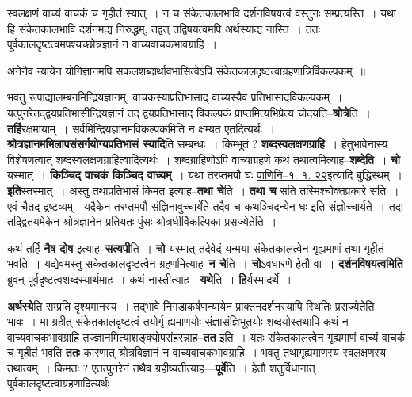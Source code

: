 \documentclass[article,12pt,a4paper]{memoir}
\begin{document}
	  \pstart स्वलक्षणं वाच्यं वाचकं च गृहीतं स्यात् । न च संकेतकालभावि दर्शनविषयत्वं वस्तुनः सम्प्रत्यस्ति । यथा हि संकेतकालभावि दर्शनमद्य निरुद्धम्, तद्वत् तद्विषयत्वमपि अर्थस्याद्य नास्ति । ततः पूर्वकालदृष्टत्वमपश्यच्छोत्रज्ञानं न वाच्यवाचकभावग्राहि ।
	\pend
        

	  \pstart अनेनैव न्यायेन योगिज्ञानमपि सकलशब्दार्थावभासित्वेऽपि संकेतकालदृष्टत्वाग्रहणान्निर्विकल्पकम् ॥
	\pend
      
	  \endgroup
	

	  \pstart भवतु रूपाद्यालम्बनमिन्द्रियज्ञानम्, वाचकस्याप्रतिभासाद् वाच्यस्यैव प्रतिभासादविकल्पकम् । यत्पुनरेतद्द्वयप्रतिभासीन्द्रियज्ञानं तद् द्वयप्रतिभासाद् विकल्पकं प्राप्तमित्यभिप्रेत्य चोदयति--\textbf{श्रोत्रे}ति । \textbf{तर्हि}रक्षमायाम् । सर्वमिन्द्रियज्ञानमविकल्पकमिति न क्षम्यत एतदित्यर्थः । \textbf{श्रोत्रज्ञानमभिलापसंसर्गयोग्यप्रतिभासं स्यादि}ति सम्बन्धः । किम्भूतं ? \textbf{शब्दस्वलक्षणग्राहि} । हेतुभावेनास्य विशेषणत्वात् शब्दस्वलक्षणग्राहित्वादित्यर्थः । शब्दग्राहिणोऽपि वाच्याग्रहणे कथं तथात्वमित्याह--\textbf{शब्देति}\leavevmode{} । \textbf{चो} यस्मात् । \textbf{किञ्चिद् वाचकं किञ्चिद् वाच्यम्} । यथा तरप्तमपौ घः \href{http://sarit.indology.info/?cref=Pā.1.1.22}{पाणिनि--१. १. २२}इत्यादि बुद्धिस्थम् । \textbf{इति}स्तस्मात् । अस्तु तथाप्रतिभासं किमत इत्याह--\textbf{तथा चे}ति । \textbf{तथा च} सति तस्मिश्चोक्तप्रकारे सति । एवं चैतद् द्रष्टव्यम्—यदैकेन तरप्तमपौ संज्ञिनावुच्चार्येते तदैव च कथञ्चिदन्येन घः इति संज्ञोच्चार्यते । तदा तद्द्वितयमेकेन श्रोत्रज्ञानेन प्रतियतः पुंसः श्रोत्रधीर्विकल्पिका प्रसज्येतेति ।
	\pend
      

	  \pstart कथं तर्हि \textbf{नैष दोष} इत्याह--\textbf{सत्यपी}ति । \textbf{चो} यस्मात् तदेवेदं यन्मया संकेतकालत्वेन गृह्यमाणं तथा गृहीतं भवति । यद्येवमस्तु सकेतकालदृष्टत्वेन ग्रहणमित्याह--\textbf{न चे}ति । \textbf{चो}ऽवधारणे हेतौ वा । \textbf{दर्शनविषयत्वमिति} ब्रुवन् पूर्वदृष्टत्वशब्दस्यार्थमाह । कथं नास्तीत्याह—\textbf{यथे}ति । \textbf{हि}र्यस्मादर्थे ।
	\pend
      

	  \pstart \textbf{अर्थस्ये}ति सम्प्रति दृश्यमानस्य । तद्भावे निगडाकर्षणन्यायेन प्राक्तनदर्शनस्यापि स्थितिः प्रसज्येतेति भावः । मा ग्रहीत् संकेतकालदृष्टत्वं तयोर्गृ ह्यमाणयोः संज्ञासंज्ञिभूतयोः शब्दयोस्तथापि कथं न वाच्यवाचकभावग्राहि तज्ज्ञानमित्याशङ्क्योपसंहरन्नाह--\textbf{तत} इति । यतः संकेतकालत्वेन गृह्यमाणं वाच्यं वाचकं च गृहीतं भवति \textbf{ततः} कारणात् श्रोत्रविज्ञानं न वाच्यवाचकभावग्राहि । भवतु तथागृह्यमाणस्य स्वलक्षणस्य तथात्वम् । किमतः ? एतत्पुनरेनं तथैव ग्रहीष्यतीत्याह—\textbf{पूर्वे}ति । हेतौ शतुर्विधानात् पूर्वकालदृष्टत्वाग्रहणादित्यर्थः ।
	\pend
      
\end{document}
